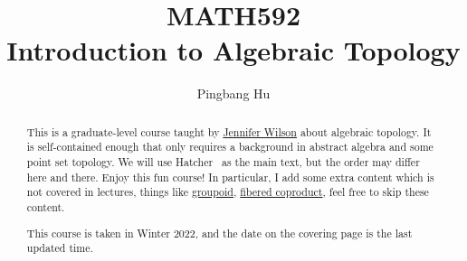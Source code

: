 \documentclass[a4paper]{report}
\author{Pingbang Hu}
\title{MATH592\\Introduction to Algebraic Topology}
\begin{document}
\maketitle

\begin{abstract}
	This is a graduate-level course taught by \href{http://www.math.lsa.umich.edu/~jchw/}{Jennifer Wilson} about algebraic topology. It is self-contained enough that only requires a background in abstract algebra and some point set topology. We will use Hatcher~\cite{hatcher2002algebraic} as the main text, but the order may differ here and there. Enjoy this fun course! In particular, I add some extra content which is not covered in lectures, things like \hyperref[def:groupoid]{groupoid}, \hyperref[def:fibered-coproduct]{fibered coproduct}, feel free to skip these content.

	\vfill
	This course is taken in Winter 2022, and the date on the covering page is the last updated time.
\end{abstract}

\tableofcontents

\newpage


\newpage
\appendix
\appendixpage



\newpage
\printbibliography
\end{document}
